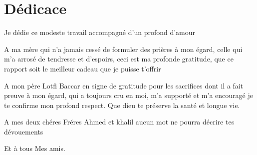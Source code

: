 \section*{Dédicace}

Je dédie ce modeste travail accompagné d'un profond d'amour

A ma mère qui n'a jamais cessé de formuler des prières à mon
égard, celle qui m'a arrosé de tendresse et d'espoirs, ceci est ma profonde gratitude, que ce rapport soit le meilleur cadeau que je puisse t'offrir

A mon père Lotfi Baccar en signe de gratitude pour les sacrifices dont il a fait
preuve à mon égard, qui a toujours cru en moi, m'a supporté et m'a encouragé je te
confirme mon profond respect. Que dieu te préserve la santé et longue
vie.

A mes deux chéres Fréres Ahmed et khalil aucun mot ne pourra décrire tes dévouements

Et à tous Mes amis.

\newpage




